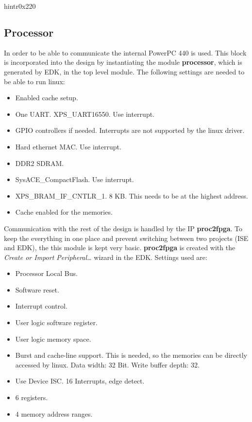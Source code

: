 \documentclass[11pt,technote,a4paper,onecolumn]{IEEEtran}
\newcommand{\module}[1]{{\ttfamily\bfseries #1}}
\begin{document}
\begin{register}{h}{intr}{0x220}%
    \label{intr}%
    \regnewline%
\end{register}
\subsection{Processor}
In order to be able to communicate the internal PowerPC 440 \cite{ppc} is used.
This block is incorporated into the design by instantiating the module
\module{processor}, which is generated by EDK, in the top level module.
The following settings are needed to be able to run linux:
\begin{itemize}
    \item Enabled cache setup.
    \item One UART. XPS\_UART16550. Use interrupt.
    \item GPIO controllers if needed. Interrupts are not supported by the
        linux driver.
    \item Hard ethernet MAC. Use interrupt.
    \item DDR2 SDRAM.
    \item SysACE\_CompactFlash. Use interrupt.
    \item XPS\_BRAM\_IF\_CNTLR\_1. 8 KB. This needs to be at the highest
        address.
    \item Cache enabled for the memories.
\end{itemize}
Communication with the rest of the design is handled by the IP
\module{proc2fpga}. To
keep the everything in one place and prevent switching between two projects
(ISE and EDK), the this module is kept very basic.
\module{proc2fpga} is created with the \emph{Create or Import Peripheral\ldots}
wizard in the EDK. Settings used are:
\begin{itemize}
    \item Processor Local Bus.
    \item Software reset.
    \item Interrupt control.
    \item User logic software register.
    \item User logic memory space.
    \item Burst and cache-line support. This is needed, so the memories can
        be directly accessed by linux. Data width: 32 Bit. Write buffer depth:
        32.
    \item Use Device ISC. 16 Interrupts, edge detect.
    \item 6 registers.
    \item 4 memory address ranges.
\end{itemize}
\end{document}
